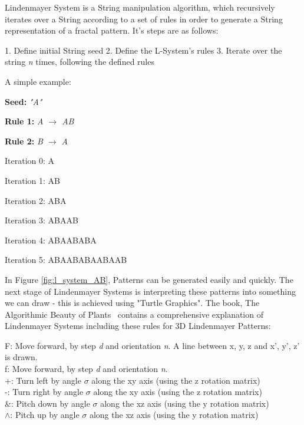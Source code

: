 \documentclass[a4paper,10pt]{report}
\begin{document}
Lindenmayer System is a String manipulation algorithm, which recursively iterates over a String according to a set of rules in order to generate a String representation of a fractal pattern. It's steps are as follows:


1. Define initial String seed
2. Define the L-System's rules
3. Iterate over the string \textit{n} times, following the defined rules


A simple example:\medskip

\textbf{Seed:} \textit{"A"}

\textbf{Rule 1:} \textit{A $\rightarrow$ AB}

\textbf{Rule 2:} \textit{B $\rightarrow$ A}


Iteration 0: A

Iteration 1: AB

Iteration 2: ABA

Iteration 3: ABAAB

Iteration 4: ABAABABA

Iteration 5: ABAABABAABAAB\medskip



In Figure \ref{fig:l_system_AB}, Patterns can be generated easily and quickly. The next stage of Lindenmayer Systems is interpreting these patterns into something we can draw - this is achieved using "Turtle Graphics". The book, The Algorithmic Beauty of Plants~\cite{prusinkiewicz2012algorithmic} contains a comprehensive explanation of Lindenmayer Systems including these rules for 3D Lindenmayer Patterns:\medskip

F: Move forward, by step \textit{d} and orientation \textit{n}. A line between {x, y, z} and {x', y', z'} is drawn. \\

f: Move forward, by step \textit{d} and orientation \textit{n}. \\

+: Turn left by angle $\sigma$ along the xy axis (using the z rotation matrix)\\

-: Turn right by angle $\sigma$ along the xy axis (using the z rotation matrix)\\

\&: Pitch down by angle $\sigma$ along the xz axis (using the y rotation matrix)\\

$\wedge$: Pitch up by angle $\sigma$ along the xz axis (using the y rotation matrix)\\
\end{document}
